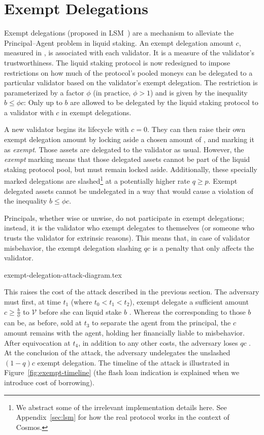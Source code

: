 \section{Exempt Delegations}

Exempt delegations (proposed in LSM~\cite{liquidity-staking-module})
are a mechanism to alleviate the Principal--Agent problem in liquid staking.
An exempt delegation amount $c$, measured in \asset, is associated
with each validator. It is a measure of the validator's trustworthiness.
The liquid staking protocol is now redesigned to impose restrictions
on how much of the protocol's pooled moneys can be delegated to a particular
validator based on the validator's exempt delegation.
The restriction is
parameterized by a factor $\phi$ (in practice, $\phi > 1$)
and is given by the inequality $b \leq \phi c$: Only up to $b$ \assets
are allowed to be delegated by the liquid staking protocol
to a validator with $c$ \assets in exempt delegations.

A new validator begins its lifecycle with $c = 0$. They can then
raise their own exempt delegation amount by locking aside a
chosen amount of \asset, and marking it as \emph{exempt}. Those
assets are delegated to the validator as usual. However,
the \emph{exempt}
marking means that those delegated assets cannot be part of the liquid
staking protocol pool, but must remain locked aside. Additionally,
these specially marked delegations are slashed\footnote{We abstract some
of the irrelevant implementation details here. See Appendix~\ref{sec:lsm}
for how the real protocol works in the context of Cosmos.}
at a potentially higher rate $q \geq p$. Exempt delegated assets cannot
be undelegated in a way that would cause a violation of the inequality
$b \leq \phi c$.

Principals, whether wise or unwise, do not participate in exempt
delegations; instead, it is the validator who exempt delegates to
themselves (or someone who trusts the validator for extrinsic reasons).
This means that, in case of validator misbehavior, the exempt delegation
slashing $qc$ is a penalty that only affects the validator.

{exempt-delegation-attack-diagram.tex}

This raises
the cost of the attack described in the previous section. The
adversary must first, at time $t_1$ (where $t_0 < t_1 < t_2$), exempt delegate a sufficient amount
$c \geq \frac{b}{\phi}$ \asset to $\mathcal{V}$ before she can liquid stake $b$ \asset.
Whereas the \stassets
corresponding to those $b$ \assets can be, as before, sold at $t_3$ to
separate the agent from the principal, the $c$ amount remains with the
agent, holding her financially liable to misbehavior. After equivocation at $t_4$,
in addition to any other costs, the adversary loses $qc$ \asset. At the conclusion
of the attack, the adversary undelegates the unslashed $(1 - q)c$ exempt delegation.
The timeline of the attack is illustrated in Figure~\ref{fig:exempt-timeline}
(the flash loan indication is explained when we introduce cost of borrowing).

